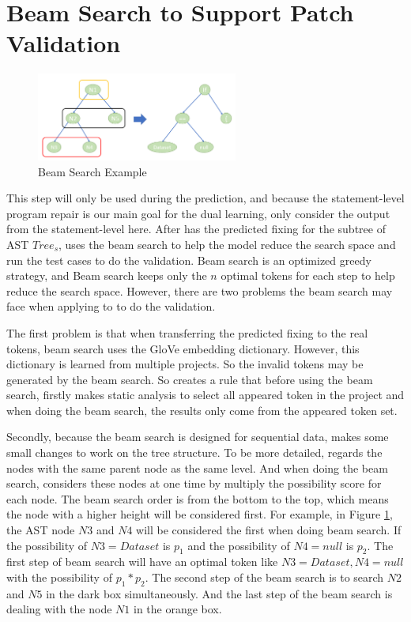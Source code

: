 \section{Beam Search to Support Patch Validation}

\begin{figure}[t]
	\centering
	\includegraphics[width=2.6in]{graphs/beam.png}
	\caption{Beam Search Example}
	\label{patch-validation}
\end{figure}



This step will only be used during the prediction, and because the statement-level program repair is our main goal for the dual learning, \tool only consider the output from the statement-level here. After \tool has the predicted fixing for the subtree of AST $Tree_s$, \tool uses the beam search to help the model reduce the search space and run the test cases to do the validation. Beam search is an optimized greedy strategy, and Beam search keeps only the $n$ optimal tokens for each step to help reduce the search space. However, there are two problems the beam search may face when applying to \tool to do the validation.

The first problem is that when transferring the predicted fixing to the real tokens, beam search uses the GloVe embedding dictionary. However, this dictionary is learned from multiple projects. So the invalid tokens may be generated by the beam search. So \tool creates a rule that before using the beam search, \tool firstly makes static analysis to select all appeared token in the project and when doing the beam search, the results only come from the appeared token set.

Secondly, because the beam search is designed for sequential data, \tool makes some small changes to work on the tree structure. To be more detailed, \tool regards the nodes with the same parent node as the same level. And when doing the beam search, \tool considers these nodes at one time by multiply the possibility score for each node. The beam search order is from the bottom to the top, which means the node with a higher height will be considered first. For example, in Figure \ref{patch-validation}, the AST node $N3$ and $N4$ will be considered the first when doing beam search. If the possibility of $N3=Dataset$ is $p_1$ and the possibility of $N4=null$ is $p_2$. The first step of beam search will have an optimal token like $N3=Dataset, N4=null$ with the possibility of $p_1*p_2$. The second step of the beam search is to search $N2$ and $N5$ in the dark box simultaneously. And the last step of the beam search is dealing with the node $N1$ in the orange box. 


